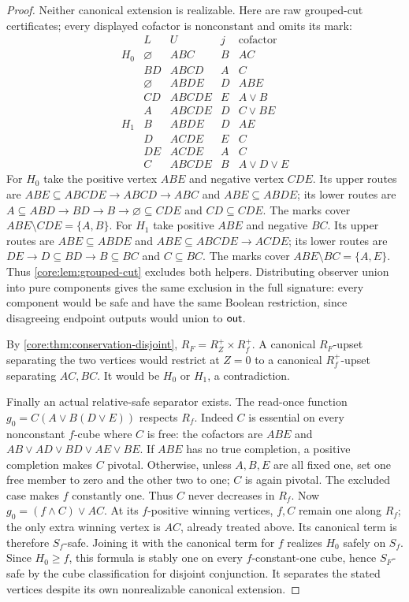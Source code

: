 \begin{proof}
Neither canonical extension is realizable. Here are raw grouped-cut
certificates; every displayed cofactor is nonconstant and omits its mark:
\[
\begin{array}{c|c|c|c|c}
 &L&U&j&\text{cofactor}\\\hline
 H_0&\varnothing&ABC&B&AC\\
 &BD&ABCD&A&C\\
 &\varnothing&ABDE&D&ABE\\
 &CD&ABCDE&E&A\vee B\\
 &A&ABCDE&D&C\vee BE\\\hline
 H_1&B&ABDE&D&AE\\
 &D&ACDE&E&C\\
 &DE&ACDE&A&C\\
 &C&ABCDE&B&A\vee D\vee E
\end{array}
\]
For $H_0$ take the positive vertex $ABE$ and negative vertex $CDE$.
Its upper routes are $ABE\subseteq ABCDE\to ABCD\to ABC$ and
$ABE\subseteq ABDE$; its lower routes are
$A\subseteq ABD\to BD\to B\to\varnothing\subseteq CDE$ and $CD\subseteq CDE$.
The marks cover $ABE\setminus CDE=\{A,B\}$.
For $H_1$ take positive $ABE$ and negative $BC$.
Its upper routes are $ABE\subseteq ABDE$ and $ABE\subseteq ABCDE\to ACDE$;
its lower routes are $DE\to D\subseteq BD\to B\subseteq BC$ and $C\subseteq BC$.
The marks cover $ABE\setminus BC=\{A,E\}$.
Thus \cref{core:lem:grouped-cut} excludes both helpers. Distributing observer
union into pure components gives the same exclusion in the full signature:
every component would be safe and have the same Boolean restriction, since
disagreeing endpoint outputs would union to $\mathsf{out}$.

By \cref{core:thm:conservation-disjoint},
$R_F=R_Z^+\times R_f^+$. A canonical $R_F$-upset separating the two
vertices would restrict at $Z=0$ to a canonical $R_f^+$-upset separating
$AC,BC$. It would be $H_0$ or $H_1$, a contradiction.

Finally an actual relative-safe separator exists. The read-once function
$g_0=C(A\vee B(D\vee E))$ respects $R_f$.
Indeed $C$ is essential on every nonconstant $f$-cube where $C$ is free: the
cofactors are $ABE$ and $AB\vee AD\vee BD\vee AE\vee BE$.
If $ABE$ has no true completion, a positive completion makes $C$ pivotal.
Otherwise, unless $A,B,E$ are all fixed one, set one free member to zero
and the other two to one; $C$ is again pivotal. The excluded case makes
$f$ constantly one. Thus $C$ never decreases in $R_f$.
Now $g_0=(f\wedge C)\vee AC$. At its $f$-positive winning vertices,
$f,C$ remain one along $R_f$; the only extra winning vertex is $AC$,
already treated above. Its canonical term is therefore $S_f$-safe.
Joining it with the canonical term for $f$ realizes $H_0$ safely on $S_f$.
Since $H_0\geq f$, this
formula is stably one on every $f$-constant-one cube, hence $S_F$-safe by
the cube classification for disjoint conjunction. It separates the stated
vertices despite its own nonrealizable canonical extension.
\end{proof}

